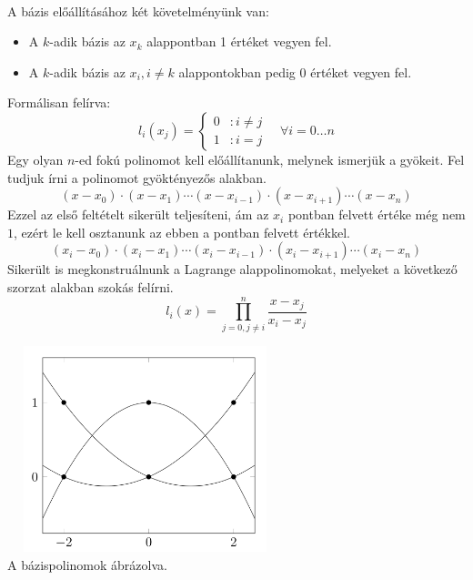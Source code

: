 \documentclass[12pt]{report}
\begin{document}
\paragraph{}
A bázis előállításához két követelményünk van:
\begin{itemize}
\item A $k$-adik bázis az $x_k$ alappontban 1 értéket vegyen fel.
\item A $k$-adik bázis az $x_i, i \neq k$ alappontokban pedig 0 értéket vegyen fel.
\end{itemize}
Formálisan felírva:
$$
l_i(x_j) =
\left\{
  \begin{array}{lr}
    0 & : i \neq j\\
    1 & : i = j
  \end{array}
\right.
\quad \forall i = 0 \dots n
$$
Egy olyan $n$-ed fokú polinomot kell előállítanunk, melynek ismerjük a gyökeit. Fel tudjuk írni a polinomot gyöktényezős alakban.
$$
(x-x_0)\cdot(x-x_1)\cdots(x-x_{i-1})\cdot(x-x_{i+1})\cdots(x-x_n)
$$
Ezzel az első feltételt sikerült teljesíteni, ám az $x_i$ pontban felvett értéke még nem $1$, ezért le kell osztanunk az ebben a pontban felvett értékkel.
$$
(x_i-x_0)\cdot(x_i-x_1)\cdots(x_i-x_{i-1})\cdot(x_i-x_{i+1})\cdots(x_i-x_n)
$$
Sikerült is megkonstruálnunk a Lagrange alappolinomokat, melyeket a következő szorzat alakban szokás felírni.
$$
l_i(x) = \prod_{j = 0, j \neq i}^{n} \frac{x-x_j}{x_i-x_j}
$$
\begin{center}
\includegraphics[width=8cm,height=6cm]{pics/lagrange_basis}\\
{\footnotesize A bázispolinomok ábrázolva.}
\end{center}
\end{document}
